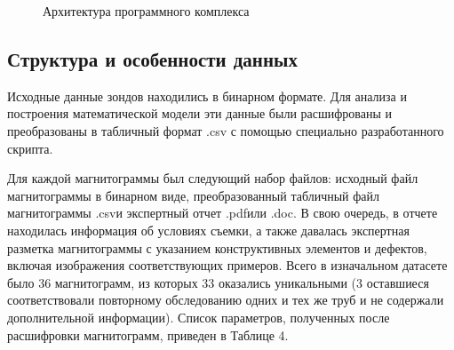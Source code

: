 \documentclass[a4paper,article,14pt]{extarticle}
\begin{document}
\begin{figure}[ht]
    \begin{center}
    
    \caption{
    \label{image3}
    Архитектура программного комплекса}
    \end {center}
\end {figure}

\subsection{Структура и особенности данных}

Исходные данные зондов находились в бинарном формате. 
Для анализа и построения математической модели 
эти данные были расшифрованы и преобразованы в табличный формат \flqq .csv\frqq
с помощью специально разработанного скрипта. 

Для каждой магнитограммы был следующий набор файлов: 
исходный файл магнитограммы в бинарном виде, преобразованный 
табличный файл магнитограммы \flqq .csv\frqq  и экспертный отчет \flqq .pdf\frqq  или \flqq .doc\frqq . 
В свою очередь, в отчете находилась информация об условиях съемки, 
а также давалась экспертная разметка магнитограммы с указанием конструктивных
элементов и дефектов, включая изображения соответствующих примеров. 
Всего в изначальном датасете было 36 магнитограмм, из которых 33 оказались 
уникальными (3 оставшиеся соответствовали повторному обследованию одних и 
тех же труб и не содержали дополнительной информации). Список параметров, полученных после 
расшифровки магнитограмм, приведен в Таблице 4. 
\end{document}
